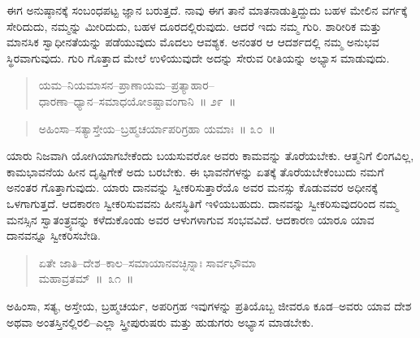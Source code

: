 ಈಗ ಅನುಷ್ಠಾನಕ್ಕೆ ಸಂಬಂಧಪಟ್ಟ ಜ್ಞಾನ ಬರುತ್ತದೆ. ನಾವು ಈಗ ತಾನೆ ಮಾತನಾಡುತ್ತಿದ್ದುದು ಬಹಳ ಮೇಲಿನ ವರ್ಗಕ್ಕೆ ಸೇರಿದುದು, ನಮ್ಮನ್ನು ಮೀರಿದುದು, ಬಹಳ ದೂರದಲ್ಲಿರುವುದು. ಆದರೆ ಇದು ನಮ್ಮ ಗುರಿ. ಶಾರೀರಿಕ ಮತ್ತು ಮಾನಸಿಕ ಸ್ವಾಧೀನತೆಯನ್ನು ಪಡೆಯುವುದು ಮೊದಲು ಆವಶ್ಯಕ. ಅನಂತರ ಆ ಆದರ್ಶದಲ್ಲಿ ನಮ್ಮ ಅನುಭವ ಸ್ಥಿರ\break ವಾಗುವುದು. ಗುರಿ ಗೊತ್ತಾದ ಮೇಲೆ ಉಳಿಯುವುದೇ ಅದನ್ನು ಸೇರುವ ರೀತಿಯನ್ನು ಅಭ್ಯಾಸ ಮಾಡುವುದು. 

\vspace{-0.3cm}

\begin{verse}
ಯಮ–ನಿಯಮಾಸನ–ಪ್ರಾಣಾಯಮ–ಪ್ರತ್ಯಾಹಾರ–\\ಧಾರಣಾ–ಧ್ಯಾನ–ಸಮಾಧಯೋಽಷ್ಟಾವಂಗಾನಿ~॥ ೨೯~॥
\end{verse}

\vspace{-0.3cm}


\vspace{-0.3cm}

\begin{verse}
ಅಹಿಂಸಾ–ಸತ್ಯಾಸ್ತೇಯ–ಬ್ರಹ್ಮಚರ್ಯಾಪರಿಗ್ರಹಾ ಯಮಾಃ~॥ ೩೦~॥
\end{verse}

\vspace{-0.3cm}


ಯಾರು ನಿಜವಾಗಿ ಯೋಗಿಯಾಗಬೇಕೆಂದು ಬಯಸುವರೋ ಅವರು ಕಾಮವನ್ನು ತೊರೆಯಬೇಕು. ಆತ್ಮನಿಗೆ ಲಿಂಗವಿಲ್ಲ, ಕಾಮಭಾವನೆಯ ಹೀನ ದೃಷ್ಟಿಗೇಕೆ ಅದು ಬರಬೇಕು. ಈ ಭಾವನೆಗಳನ್ನು ಏತಕ್ಕೆ ತೊರೆಯಬೇಕೆಂಬುದು ನಮಗೆ ಅನಂತರ ಗೊತ್ತಾಗುವುದು. ಯಾರು ದಾನವನ್ನು ಸ್ವೀಕರಿಸುತ್ತಾರೆಯೊ ಅವರ ಮನಸ್ಸು ಕೊಡುವವರ ಅಧೀನಕ್ಕೆ ಒಳಗಾಗುತ್ತದೆ. ಆದಕಾರಣ ಸ್ವೀಕರಿಸುವವನು ಹೀನಸ್ಥಿತಿಗೆ ಇಳಿಯಬಹುದು. ದಾನವನ್ನು ಸ್ವೀಕರಿಸುವುದರಿಂದ ನಮ್ಮ ಮನಸ್ಸಿನ ಸ್ವಾತಂತ್ರ್ಯವನ್ನು ಕಳೆದುಕೊಂಡು ಅವರ ಆಳುಗಳಾಗುವ ಸಂಭವವಿದೆ. ಆದಕಾರಣ ಯಾರೂ ಯಾವ ದಾನವನ್ನೂ ಸ್ವೀಕರಿಸಬೇಡಿ. 

\vspace{-0.3cm}

\begin{verse}
ಏತೇ ಜಾತಿ–ದೇಶ–ಕಾಲ–ಸಮಾಯಾನವಚ್ಛಿನ್ನಾಃ ಸಾರ್ವಭೌಮಾ \\ಮಹಾವ್ರತಮ್​~॥~೩೧~॥
\end{verse}

\vspace{-0.3cm}


ಅಹಿಂಸಾ, ಸತ್ಯ, ಅಸ್ತೇಯ, ಬ್ರಹ್ಮಚರ್ಯ, ಅಪರಿಗ್ರಹ ಇವುಗಳನ್ನು ಪ್ರತಿಯೊಬ್ಬ ಜೀವರೂ ಕೂಡ–ಅವರು ಯಾವ ದೇಶ ಅಥವಾ ಅಂತಸ್ತಿನಲ್ಲಿರಲಿ–ಎಲ್ಲಾ ಸ್ತ್ರೀಪುರುಷರು ಮತ್ತು ಹುಡುಗರು ಅಭ್ಯಾಸ ಮಾಡಬೇಕು. 

